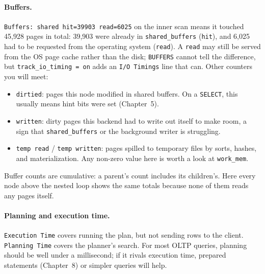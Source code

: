 \paragraph{Buffers.} \texttt{Buffers: shared hit=39903 read=6025} on the inner scan means it touched 45,928 pages in total: 39,903 were already in \texttt{shared\_buffers} (\texttt{hit}), and 6,025 had to be requested from the operating system (\texttt{read}). A \texttt{read} may still be served from the OS page cache rather than the disk; \texttt{BUFFERS} cannot tell the difference, but \texttt{track\_io\_timing = on} adds an \texttt{I/O Timings} line that can. Other counters you will meet:
\begin{itemize}
  \item \texttt{dirtied}: pages this node modified in shared buffers. On a \texttt{SELECT}, this usually means hint bits were set (Chapter~5).
  \item \texttt{written}: dirty pages this backend had to write out itself to make room, a sign that \texttt{shared\_buffers} or the background writer is struggling.
  \item \texttt{temp read} / \texttt{temp written}: pages spilled to temporary files by sorts, hashes, and materialization. Any non-zero value here is worth a look at \texttt{work\_mem}.
\end{itemize}
Buffer counts are cumulative: a parent's count includes its children's. Here every node above the nested loop shows the same totals because none of them reads any pages itself.

\paragraph{Planning and execution time.} \texttt{Execution Time} covers running the plan, but not sending rows to the client. \texttt{Planning Time} covers the planner's search. For most OLTP queries, planning should be well under a millisecond; if it rivals execution time, prepared statements (Chapter~8) or simpler queries will help.

